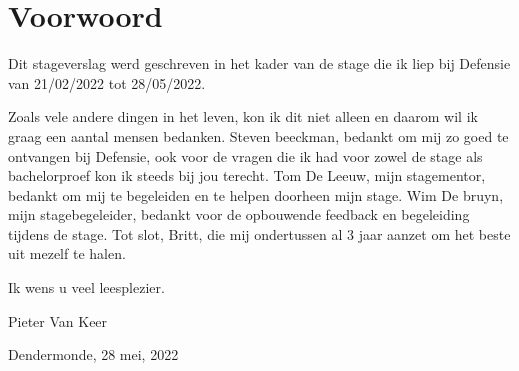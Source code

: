 \section{Voorwoord}
\label{sec:voorwoord}




Dit stageverslag werd geschreven in het kader van de stage die ik liep bij Defensie van 21/02/2022 tot 28/05/2022.

Zoals vele andere dingen in het leven, kon ik dit niet alleen en daarom wil ik graag een aantal mensen bedanken. Steven beeckman, bedankt om mij zo goed te ontvangen bij Defensie, ook voor de vragen die ik had voor zowel de stage als bachelorproef kon ik steeds bij jou terecht. Tom De Leeuw, mijn stagementor, bedankt om mij te begeleiden en te helpen doorheen mijn stage. Wim De bruyn, mijn stagebegeleider, bedankt voor de opbouwende feedback en begeleiding tijdens de stage. Tot slot, Britt, die mij ondertussen al 3 jaar aanzet om het beste uit mezelf te halen.

\begin{flushleft}
    
Ik wens u veel leesplezier.
\end{flushleft}

\begin{flushleft}

Pieter Van Keer

Dendermonde, 28 mei, 2022

\end{flushleft}